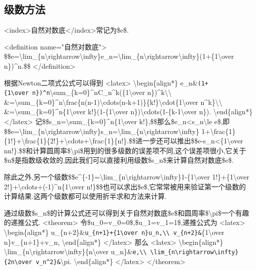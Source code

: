 \documentclass[
]{article}
\begin{document}
\hypertarget{ux7ea7ux6570ux65b9ux6cd5-1}{%
\subsection{级数方法}\label{ux7ea7ux6570ux65b9ux6cd5-1}}

\textless index\textgreater 自然对数底\textless/index\textgreater 常记为\$e\$.

\textless definition name="自然对数底"\textgreater{}
\$\$e=\textbackslash lim\_\{n\textbackslash rightarrow\textbackslash infty\}e\_n=\textbackslash lim\_\{n\textbackslash rightarrow\textbackslash infty\}(1+\{1\textbackslash over
n\})\^{}n.\$\$ \textless/definition\textgreater{}

根据Newton二项式公式可以得到 \textless latex\textgreater{}
\textbackslash begin\{align*\}
e\_n\&\texttt{(1+\{1\textbackslash{}over\ n\})\^{}n}\textbackslash sum\_\{k=0\}\^{}nC\_n\^{}k(\{1\textbackslash over
n\})\^{}k\textbackslash\textbackslash{}
\&=\textbackslash sum\_\{k=0\}\^{}n\textbackslash frac\{n(n-1)\textbackslash cdots(n-k+1)\}\{k!\}\textbackslash cdot\{1\textbackslash over
n\^{}k\}\textbackslash\textbackslash{}
\&=\textbackslash sum\_\{k=0\}\^{}n\{1\textbackslash over
k!\}(1-\{1\textbackslash over
n\})\textbackslash cdots(1-\{k-1\textbackslash over n\}).
\textbackslash end\{align*\} \textless/latex\textgreater{}
记\$\$s\_n=\textbackslash sum\_\{k=0\}\^{}n\{1\textbackslash over
k!\},\$\$那么\$e\_n\textless s\_n\textbackslash le
e\$,即\$\$e=\textbackslash lim\_\{n\textbackslash rightarrow\textbackslash infty\}s\_n=\textbackslash lim\_\{n\textbackslash rightarrow\textbackslash infty\}
1+\textbackslash frac\{1\}\{1!\}+\textbackslash frac\{1\}\{2!\}+\textbackslash cdots+\textbackslash frac\{1\}\{n!\}.\$\$进一步还可以推出\$\$\textbar e-s\_n\textbar\textless\{1\textbackslash over
nn!\}.\$\$和计算圆周率\$\textbackslash pi\$用到的很多级数的误差项不同,这个误差项很小,它关于\$n\$是指数级收敛的,因此我们可以直接利用级数\$s\_n\$来计算自然对数底\$e\$.

除此之外,另一个级数\$\$e\^{}\{-1\}=\textbackslash lim\_\{n\textbackslash rightarrow\textbackslash infty\}1-\{1\textbackslash over
1!\}+\{1\textbackslash over
2!\}+\textbackslash cdots+(-1)\^{}n\{1\textbackslash over
n!\}\$\$也可以求出\$e\$,它常常被用来验证第一个级数的计算结果.这两个级数都可以使用折半求和方法来计算.

通过级数\$s\_n\$的计算公式还可以得到关于自然对数底\$e\$和圆周率\$\textbackslash pi\$一个有趣的递推公式.
\textless theorem\textgreater{}
令\$u\_0=v\_0=0\$,\$u\_1=v\_1=1\$,递推公式为
\textless latex\textgreater{} \textbackslash begin\{align*\}
u\_\{n+2\}\&\texttt{u\_\{n+1\}+\{1\textbackslash{}over\ n\}u\_n,\textbackslash{}\textbackslash{}
v\_\{n+2\}\&}\{1\textbackslash over n\}v\_\{n+1\}+v\_n,
\textbackslash end\{align*\} \textless/latex\textgreater{} 那么
\textless latex\textgreater{} \textbackslash begin\{align*\}
\textbackslash lim\_\{n\textbackslash rightarrow\textbackslash infty\}\{n\textbackslash over
u\_n\}\&\texttt{e,\textbackslash{}\textbackslash{}
\textbackslash{}lim\_\{n\textbackslash{}rightarrow\textbackslash{}infty\}\{2n\textbackslash{}over\ v\_n\^{}2\}\&}\textbackslash pi.
\textbackslash end\{align*\} \textless/latex\textgreater{}
\textless/theorem\textgreater{}
\end{document}
